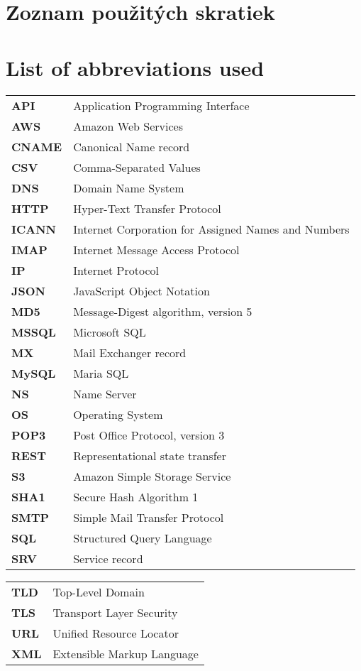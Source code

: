 \thispagestyle{plain}

\ifx\FIITlagEN\undefined
\section*{\Huge Zoznam použitých skratiek}
\else
\section*{\Huge List of abbreviations used}
\fi
\vskip 1cm

\begin{tabular}{ >{\bfseries}m{2cm} m{10cm} }
API		& Application Programming Interface \\
AWS		& Amazon Web Services \\
CNAME	& Canonical Name record \\
CSV		& Comma-Separated Values \\
DNS		& Domain Name System \\
HTTP	& Hyper-Text Transfer Protocol \\
ICANN	& Internet Corporation for Assigned Names and Numbers \\
IMAP	& Internet Message Access Protocol \\
IP		& Internet Protocol \\
JSON	& JavaScript Object Notation \\
MD5		& Message-Digest algorithm, version 5 \\
MSSQL	& Microsoft SQL \\
MX		& Mail Exchanger record \\
MySQL	& Maria SQL  \\
NS		& Name Server \\
OS		& Operating System \\
POP3    & Post Office Protocol, version 3\\
REST    & Representational state transfer \\
S3		& Amazon Simple Storage Service \\
SHA1	& Secure Hash Algorithm 1 \\
SMTP	& Simple Mail Transfer Protocol \\
SQL		& Structured Query Language \\
SRV		& Service record
\end{tabular}

\begin{tabular}{ >{\bfseries}m{2cm} m{10cm} }
TLD		& Top-Level Domain \\
TLS     & Transport Layer Security \\
URL		& Unified Resource Locator \\
XML		& Extensible Markup Language  
\end{tabular}

\emptypage